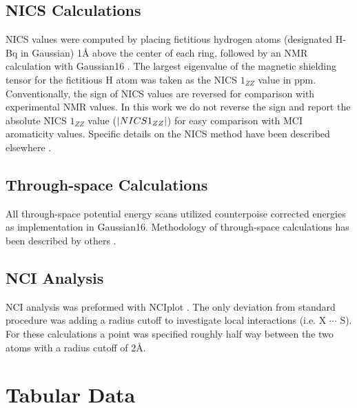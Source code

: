 \subsection{NICS Calculations}
NICS values were computed by placing fictitious hydrogen atoms (designated H-Bq in Gaussian) 1\si{\angstrom} above the center of each ring, followed by an NMR calculation with Gaussian16 \cite{g16}. The largest eigenvalue of the magnetic shielding tensor for the fictitious H atom was taken as the NICS $1_{ZZ}$ value in ppm. Conventionally, the sign of NICS values are reversed for comparison with experimental NMR values. In this work we do not reverse the sign and report the absolute NICS $1_{ZZ}$ value ($\abs*{NICS 1_{ZZ}}$) for easy comparison with MCI aromaticity values. Specific details on the NICS method have been described elsewhere \cite{Fallah-Bagher-Shaidaei2006, Chen2005}.

\subsection{Through-space Calculations}
All through-space potential energy scans utilized counterpoise corrected energies as implementation in Gaussian16. Methodology of through-space calculations has been described by others \cite{Jackson2013}.

\subsection{NCI Analysis}
NCI analysis was preformed with NCIplot \cite{Johnson2010, Contreras-Garcia2011}. The only deviation from standard procedure was adding a radius cutoff to investigate local interactions (i.e. X $\cdots$ S). For these calculations a point was specified roughly half way between the two atoms with a radius cutoff of 2\AA.

\clearpage
\section{Tabular Data}

